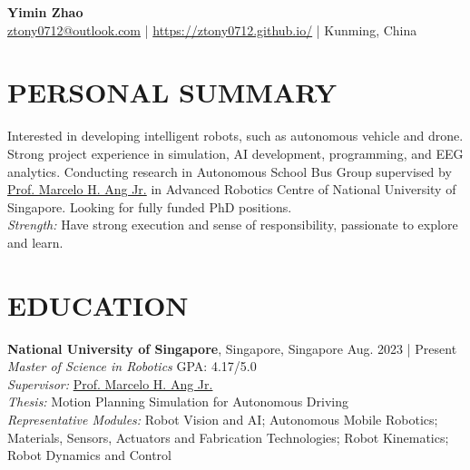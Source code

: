 \documentclass[a4paper,9pt]{extarticle}
\begin{document}
\pagestyle{fancy}
\renewcommand{\headrulewidth}{0pt}
\fancyhead{}
\thispagestyle{empty} %

\begin{center}
\textbf{\Huge Yimin Zhao}\\ %

\faEnvelope \href{mailto:ztony0712@outlook.com}{ztony0712@outlook.com} | 
\faGlobe \href{https://ztony0712.github.io/}{https://ztony0712.github.io/} | 
\faHome Kunming, China %
\end{center}

\section*{PERSONAL SUMMARY}
\noindent
Interested in developing intelligent robots, such as autonomous vehicle and drone. Strong project experience in simulation, AI development, programming, and EEG analytics. Conducting research in Autonomous School Bus Group supervised by \href{https://guppy.mpe.nus.edu.sg/~mpeangh/}{Prof. Marcelo H. Ang Jr.} in Advanced Robotics Centre of National University of Singapore. Looking for fully funded PhD positions. \\

\noindent
\textit{Strength:} Have strong execution and sense of responsibility, passionate to explore and learn.

\section*{EDUCATION}
\noindent
\textbf{National University of Singapore}, Singapore, Singapore \hfill Aug. 2023 | Present \\ %
\textit{Master of Science in Robotics} \hfill GPA: 4.17/5.0 \\
\textit{Supervisor:} \href{https://guppy.mpe.nus.edu.sg/~mpeangh/}{Prof. Marcelo H. Ang Jr.} \\
\textit{Thesis:} Motion Planning Simulation for Autonomous Driving \\
\textit{Representative Modules:} Robot Vision and AI; Autonomous Mobile Robotics; Materials, Sensors, Actuators and Fabrication Technologies; Robot Kinematics; Robot Dynamics and Control  \\
\end{document}
